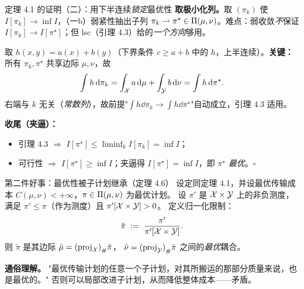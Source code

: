 \begin{frame}{定理 4.1 的证明（二）：用下半连续\emph{锁定}最优性}
  \textbf{取极小化列。}\proofskipnote 取 $(\pi_k)$ 使 $I[\pi_k]\to\inf I$，（一b）弱紧性抽出子列 $\pi_k\rightharpoonup\pi^\star\in\Pi(\mu,\nu)$。难点：弱收敛\emph{不}保证 $I[\pi_k]\to I[\pi^\star]$；但 lsc（引理 4.3）给的\emph{一个方向}够用。

   取 $h(x,y)=a(x)+b(y)$（下界条件 $c\ge a+b$ 中的 $h$，上半连续）。\textbf{关键：}所有 $\pi_k,\pi^\star$ 共享边际 $\mu,\nu$，故
  \[
    \int h\,\mathrm{d}\pi_k=\int_{\mathcal{X}} a\,\mathrm{d}\mu+\int_{\mathcal{Y}} b\,\mathrm{d}\nu=\int h\,\mathrm{d}\pi^\star .
  \]
  右端与 $k$ 无关（\emph{常数列}），故前提"$\int h\dd\pi_k\to\int h\dd\pi^\star$"自动成立，引理 4.3 适用。

  \textbf{收尾（夹逼）：}
  \begin{itemize}\small
    \item 引理 4.3 $\Rightarrow$ $I[\pi^\star]\le\liminf_k I[\pi_k]=\inf I$；
    \item 可行性 $\Rightarrow$ $I[\pi^\star]\ge\inf I$；夹逼得 $I[\pi^\star]=\inf I$，即 $\pi^\star$ \emph{最优}。\hfill$\square$
  \end{itemize}

\end{frame}

\begin{frame}{第二件好事：最优性被子计划继承（定理 4.6）}
  设定同定理 4.1，并设最优传输成本 $C(\mu,\nu)<+\infty$，$\pi\in\Pi(\mu,\nu)$ 为最优计划。
  设 $\pi'$ 是 $\mathcal{X}\times\mathcal{Y}$ 上的非负测度，满足 $\pi'\le\pi$（作为测度）且 $\pi'[\mathcal{X}\times\mathcal{Y}]>0$。
  定义归一化限制：
  \[
    \tilde{\pi} \;:=\; \frac{\pi'}{\pi'[\mathcal{X}\times\mathcal{Y}]}.
  \]
  则 $\tilde{\pi}$ 是其边际 $\tilde{\mu}={(\mathrm{proj}_{\mathcal{X}})}_{\#}\tilde{\pi}$，
  $\tilde{\nu}={(\mathrm{proj}_{\mathcal{Y}})}_{\#}\tilde{\pi}$ 之间的\emph{最优}耦合。

  \textbf{通俗理解。} "最优传输计划的任意一个子计划，对其所搬运的那部分质量来说，也是最优的。"
  否则可以局部改进子计划，从而降低整体成本——矛盾。

\end{frame}


